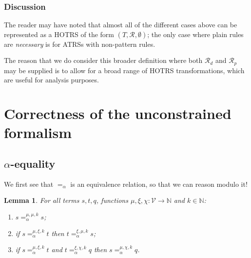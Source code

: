 \documentclass{lmcs}
\theoremstyle{theorem}\newtheorem{theorem}[dummy]{Theorem}
\theoremstyle{theorem}\newtheorem{lemma}[dummy]{Lemma}
\theoremstyle{theorem}\newtheorem{corollary}[dummy]{Corollary}
\theoremstyle{definition}\newtheorem{definition}[dummy]{Definition}
\theoremstyle{definition}\newtheorem{example}[dummy]{Example}
\newcommand{\N}{\mathbb{N}}
\newcommand{\V}{\mathcal{V}}
\newcommand{\Rules}{\mathcal{R}}
\newcommand{\mysubsection}[1]{\vspace{-12pt}\subsubsection{#1}}
\begin{document}
\mysubsection{Discussion} The reader may have noted that almost all of the different cases
above can be represented as a HOTRS of the form $(T,\Rules,\emptyset)$; the only case where
plain rules are \emph{necessary} is for ATRSs with non-pattern rules.

The reason that we do consider this broader definition where both $\Rules_d$ and $\Rules_p$ may
be supplied is to allow for a broad range of HOTRS transformations, which are useful for
analysis purposes.

\appendix

\section{Correctness of the unconstrained formalism}

\subsection{$\alpha$-equality}

We first see that $=_\alpha$ is an equivalence relation, so that we can reason modulo it!

\begin{lemma}\label{lem:alphaequiv}
For all terms $s,t,q$, functions $\mu,\xi,\chi : \V \to \N$ and $k \in \N$:
\begin{enumerate}
\item\label{lem:alphaequiv:reflexive}
  $s =_\alpha^{\mu,\mu,k} s$;
\item\label{lem:alphaequiv:symmetric}
  if $s =_\alpha^{\mu,\xi,k} t$ then $t =_\alpha^{\xi,\mu,k} s$;
\item\label{lem:alphaequiv:transitive}
  if $s =_\alpha^{\mu,\xi,k} t$ and $t =_\alpha^{\xi,\chi,k} q$ then $s =_\alpha^{\mu,\chi,k} q$.
\end{enumerate}
\end{lemma}
\end{document}
